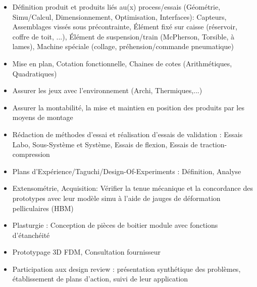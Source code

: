 \documentclass[]{friggeri-cv}
\begin{document}
\begin{itemize}
\setlength{\itemsep}{1pt}
\setlength{\parskip}{0pt}
\setlength{\parsep}{0pt}

\item Définition produit et produits liés au(x) process/essais (Géométrie, Simu/Calcul, Dimensionnement, Optimisation, Interfaces): Capteurs, Assemblages vissés sous précontrainte, Élément fixé sur caisse (réservoir, coffre de toit, ...), Élément de suspension/train (McPherson, Torsible, à lames), Machine spéciale (collage, préhension/commande pneumatique)
\item Mise en plan, Cotation fonctionnelle, Chaines de cotes (Arithmétiques, Quadratiques)
\item Assurer les jeux avec l'environnement (Archi, Thermiques,...)
\item Assurer la montabilité, la mise et maintien en position des produits par les moyens de montage
\item Rédaction de méthodes d’essai et réalisation d’essais de validation : Essais Labo, Sous-Système et Système, Essais de flexion, Essais de traction-compression
\item Plans d’Expérience/Taguchi/Design-Of-Experiments : Définition, Analyse
\item Extensométrie, Acquisition: Vérifier la tenue mécanique et la concordance des prototypes avec leur modèle simu à l’aide de jauges de déformation pelliculaires (HBM)
\item Plasturgie : Conception de pièces de boitier module avec fonctions d’étanchéité
\item Prototypage 3D FDM, Consultation fournisseur
\item Participation aux design review : présentation synthétique des problèmes, établissement de plans d’action, suivi de leur application
\end{itemize}
\end{document}
